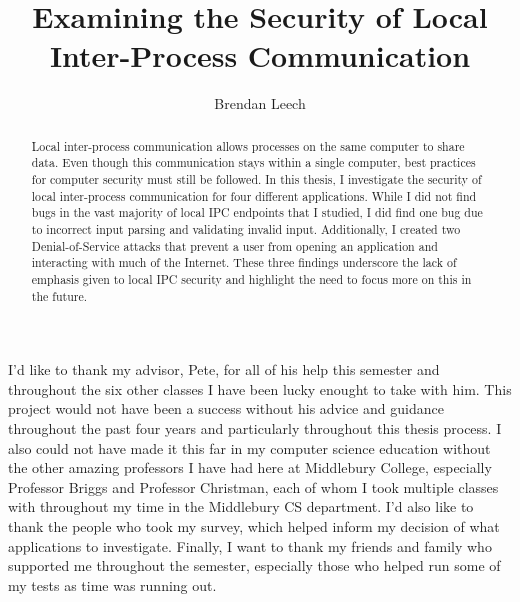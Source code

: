 \documentclass[midd]{thesis}
\title {Examining the Security of Local Inter-Process Communication}
\author {Brendan Leech}
\begin{document}
\maketitle
{}

\begin{abstract}
Local inter-process communication allows processes on the same computer to share data.  Even though this communication stays within a single computer, best practices for computer security must still be followed.  In this thesis, I investigate the security of local inter-process communication for four different applications.  While I did not find bugs in the vast majority of local IPC endpoints that I studied, I did find one bug due to incorrect input parsing and validating invalid input.  Additionally, I created two Denial-of-Service attacks that prevent a user from opening an application and interacting with much of the Internet.  These three findings underscore the lack of emphasis given to local IPC security and highlight the need to focus more on this in the future.
\end{abstract}

\begin{acknowledgements}
I'd like to thank my advisor, Pete, for all of his help this semester and throughout the six other classes I have been lucky enought to take with him.  This project would not have been a success without his advice and guidance throughout the past four years and particularly throughout this thesis process.  I also could not have made it this far in my computer science education without the other amazing professors I have had here at Middlebury College, especially Professor Briggs and Professor Christman, each of whom I took multiple classes with throughout my time in the Middlebury CS department.  I'd also like to thank the people who took my survey, which helped inform my decision of what applications to investigate.  Finally, I want to thank my friends and family who supported me throughout the semester, especially those who helped run some of my tests as time was running out.
\end{acknowledgements}

\contentspage
\tablelistpage   %
\figurelistpage

\normalspacing \setcounter{page}{1} 









\appendix






\end{document}
